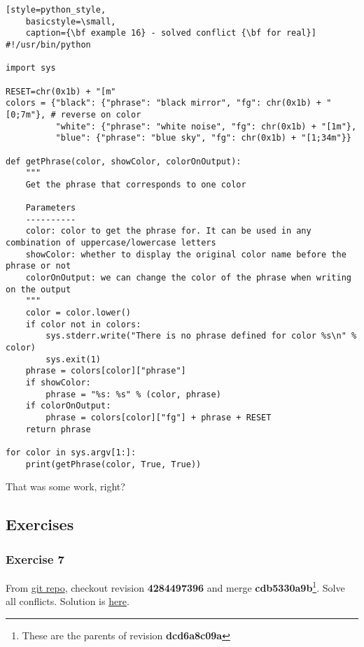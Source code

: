 \begin{lstlisting}[style=python_style,
	basicstyle=\small,
	caption={\bf example 16} - solved conflict {\bf for real}]
#!/usr/bin/python

import sys

RESET=chr(0x1b) + "[m"
colors = {"black": {"phrase": "black mirror", "fg": chr(0x1b) + "[0;7m"}, # reverse on color
          "white": {"phrase": "white noise", "fg": chr(0x1b) + "[1m"},
          "blue": {"phrase": "blue sky", "fg": chr(0x1b) + "[1;34m"}}

def getPhrase(color, showColor, colorOnOutput):
    """
    Get the phrase that corresponds to one color
    
    Parameters
    ----------
    color: color to get the phrase for. It can be used in any combination of uppercase/lowercase letters
    showColor: whether to display the original color name before the phrase or not
    colorOnOutput: we can change the color of the phrase when writing on the output
    """
    color = color.lower()
    if color not in colors:
        sys.stderr.write("There is no phrase defined for color %s\n" % color)
        sys.exit(1)
    phrase = colors[color]["phrase"]
    if showColor:
        phrase = "%s: %s" % (color, phrase)
    if colorOnOutput:
        phrase = colors[color]["fg"] + phrase + RESET
    return phrase

for color in sys.argv[1:]:
    print(getPhrase(color, True, True))
\end{lstlisting}

That was some work, right?

\subsection{Exercises}

\subsubsection{Exercise 7}

From \hyperref[git_repo]{git repo}, checkout revision {\bf 4284497396} and merge {\bf cdb5330a9b}\footnote{These are the
parents of revision {\bf dcd6a8c09a}}. Solve all conflicts. Solution is \hyperref[exercise_07]{here}.

